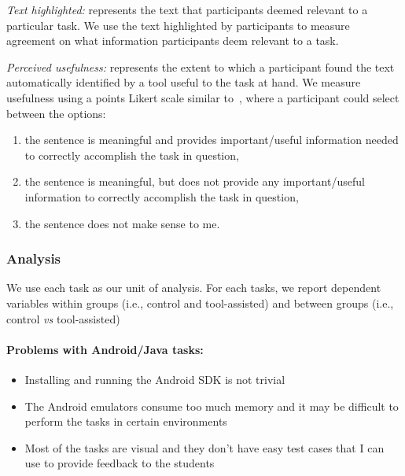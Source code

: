 \textit{Text highlighted:} represents the text that participants deemed relevant to a particular task. We use the text highlighted by participants to measure agreement on what information participants deem relevant to a task.



\textit{Perceived usefulness:} represents the extent to which a participant found the text automatically identified by a tool useful to the task at hand. We measure usefulness using a  points Likert scale similar to~\cite{nadi2020}, where a participant could select between the options:


\begin{enumerate}[label=\textit{\alph*.}]
\item the sentence is meaningful
and provides important/useful information needed to
correctly accomplish the task in question,
\item the
sentence is meaningful, but does not provide any important/useful information to correctly accomplish the task in question,
\item the sentence does not make sense to me.
\end{enumerate}




\subsubsection{Analysis}


We use each task as our unit of analysis. For each tasks, we report dependent variables within groups (i.e., control and tool-assisted) and between groups (i.e., control \textit{vs} tool-assisted)



\clearpage



\smallskip
\paragraph{\textbf{Problems with Android/Java tasks:}}

\begin{itemize}
    \item Installing and running the Android SDK is not trivial
    \item The Android emulators consume too much memory and it may be difficult to perform the tasks in certain environments
    \item Most of the tasks are visual and they don't have easy test cases that I can use to provide feedback to the students
\end{itemize}



